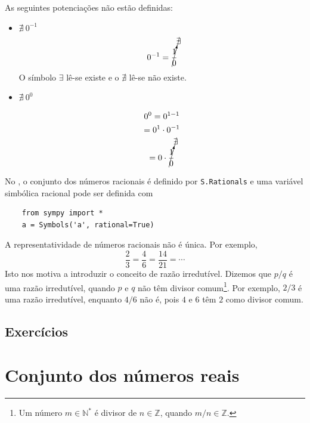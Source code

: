 \begin{obs}
  As seguintes potenciações não estão definidas:
  \begin{itemize}
  \item $\nexists ~0^{-1}$
    \begin{equation}
      0^{-1} = \cancelto{\nexists}{\frac{1}{0}}
    \end{equation}
    O símbolo $\exists$ lê-se existe e o $\nexists$ lê-se não existe.
    
  \item $\nexists ~0^0$

    \begin{gather}
      0^0 = 0^{1-1} \\
      = 0^1\cdot 0^{-1}\\
      = 0\cdot \cancelto{\nexists}{\frac{1}{0}}
    \end{gather}
  \end{itemize}
\end{obs}

\ifispython
\begin{obs}
  No \sympy, o conjunto dos números racionais é definido por \lstinline!S.Rationals! e uma variável simbólica racional pode ser definida com
  \begin{lstlisting}
    from sympy import *
    a = Symbols('a', rational=True)
  \end{lstlisting}
\end{obs}
\fi

\begin{obs}
  A representatividade de números racionais não é única. Por exemplo,
  \begin{equation}
    \frac{2}{3} = \frac{4}{6} = \frac{14}{21} = \cdots
  \end{equation}
  Isto nos motiva a introduzir o conceito de razão irredutível. Dizemos que $p/q$ é uma razão irredutível, quando $p$ e $q$ não têm divisor comum\footnote{Um número $m\in\mathbb{N}^*$ é divisor de $n\in\mathbb{Z}$, quando $m/n\in\mathbb{Z}$.}. Por exemplo, $2/3$ é uma razão irredutível, enquanto $4/6$ não é, pois $4$ e $6$ têm $2$ como divisor comum.
\end{obs}

\subsection*{Exercícios}

\emconstrucao

\section{Conjunto dos números reais}

